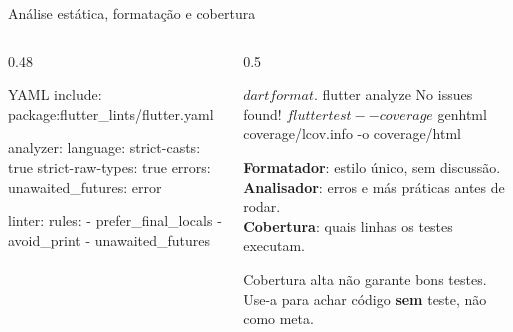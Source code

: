 \documentclass[aspectratio=169,10pt]{beamer}
\begin{document}
\begin{frame}[fragile]{Análise estática, formatação e cobertura}
  \begin{columns}[T]
    \begin{column}{0.48\textwidth}
\begin{codigo}[title=analysis\_options.yaml]{YAML}
include: package:flutter_lints/flutter.yaml

analyzer:
  language:
    strict-casts: true
    strict-raw-types: true
  errors:
    unawaited_futures: error

linter:
  rules:
    - prefer_final_locals
    - avoid_print
    - unawaited_futures
\end{codigo}
    \end{column}
    \begin{column}{0.5\textwidth}
\begin{terminal}
$ dart format .
$ flutter analyze
No issues found!
$ flutter test --coverage
$ genhtml coverage/lcov.info -o coverage/html
\end{terminal}
      \begin{conceito}
        \textbf{Formatador}: estilo único, sem discussão.\\
        \textbf{Analisador}: erros e más práticas antes de rodar.\\
        \textbf{Cobertura}: quais linhas os testes executam.
      \end{conceito}
      \begin{atencao}
        Cobertura alta não garante bons testes. Use-a para achar código \textbf{sem} teste, não como meta.
      \end{atencao}
    \end{column}
  \end{columns}
\end{frame}
\end{document}
